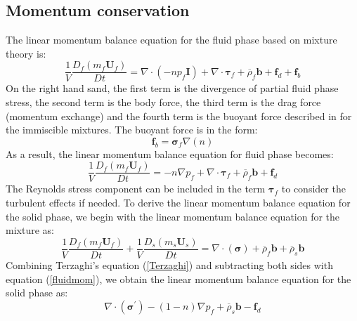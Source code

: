 \documentclass[preprint,12pt]{elsarticle}
\begin{document}
\subsection{\textsf{Momentum conservation}}
%
%
The linear momentum balance equation for the fluid phase based on mixture theory is:\\
%
%
\begin{equation}
    \frac{1}{V}\frac{D_f(m_f \pmb{U}_f)}{Dt} = 
    \nabla \cdot (-np_f\pmb{I}) + \nabla \cdot \pmb{\tau}_f + \overline{\rho}_f \pmb{b} + \pmb{f}_{d} + \pmb{f}_b
\end{equation}
%
%
On the right hand sand, the first term is the divergence of partial fluid phase stress, the second term is the body force, the third term is the drag force (momentum exchange) and the fourth term is the buoyant force described in \cite{DRUMHELLER} for the immiscible mixtures. The buoyant force is in the form:\\
%
%
\begin{equation}
    \pmb{f}_b = \pmb{\sigma}_f\nabla (n)
\end{equation}
%
%
As a result, the linear momentum balance equation for fluid phase becomes:
%
%
\begin{equation}
    \label{fluidmom}
     \frac{1}{V}\frac{D_f(m_f \pmb{U}_f)}{Dt} = -n\nabla p_f + \nabla \cdot \pmb{\tau}_f + 
   \overline{\rho}_f \pmb{b} +
     \pmb{f}_{d}
\end{equation}
%
%
The Reynolds stress component can be included in the term $\pmb{\tau}_f$ to consider the turbulent effects if needed. To derive the linear momentum balance equation for the solid phase, we begin with the linear momentum balance equation for the mixture as:
%
%
\begin{equation}
    \label{totalmom}
     \frac{1}{V}\frac{D_f(m_f \pmb{U}_f)}{Dt}
    +  \frac{1}{V}\frac{D_s(m_s \pmb{U}_s)}{Dt} = 
    \nabla \cdot (\pmb{\sigma}) + \overline{\rho}_f \pmb{b} 
    + \overline{\rho}_s \pmb{b}
\end{equation}
%
%
Combining Terzaghi's equation (\ref{Terzaghi}) and subtracting both sides with equation (\ref{fluidmom}), we obtain the linear momentum balance equation for the solid phase as:
%
%
\begin{equation}
    \label{solidmom}
    \nabla \cdot (\pmb{\sigma}^\prime) - (1-n) \nabla p_f 
    + \overline{\rho}_s \pmb{b}
    - \pmb{f}_{d}
\end{equation}
%
%
\end{document}
